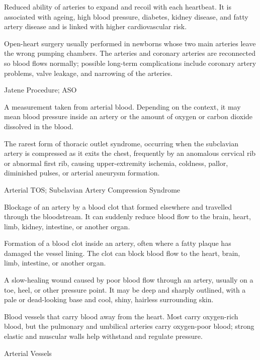  Reduced ability of arteries to expand and recoil with each heartbeat. It is associated with ageing, high blood pressure, diabetes, kidney disease, and fatty artery disease and is linked with higher cardiovascular risk.

 Open-heart surgery usually performed in newborns whose two main arteries leave the wrong pumping chambers. The arteries and coronary arteries are reconnected so blood flows normally; possible long-term complications include coronary artery problems, valve leakage, and narrowing of the arteries.

\synonyms
Jatene Procedure; ASO

 A measurement taken from arterial blood. Depending on the context, it may mean blood pressure inside an artery or the amount of oxygen or carbon dioxide dissolved in the blood.

 The rarest form of thoracic outlet syndrome, occurring when the subclavian artery is compressed as it exits the chest, frequently by an anomalous cervical rib or abnormal first rib, causing upper-extremity ischemia, coldness, pallor, diminished pulses, or arterial aneurysm formation.

\synonyms
Arterial TOS; Subclavian Artery Compression Syndrome

 Blockage of an artery by a blood clot that formed elsewhere and travelled through the bloodstream. It can suddenly reduce blood flow to the brain, heart, limb, kidney, intestine, or another organ.

 Formation of a blood clot inside an artery, often where a fatty plaque has damaged the vessel lining. The clot can block blood flow to the heart, brain, limb, intestine, or another organ.

 A slow-healing wound caused by poor blood flow through an artery, usually on a toe, heel, or other pressure point. It may be deep and sharply outlined, with a pale or dead-looking base and cool, shiny, hairless surrounding skin.

 Blood vessels that carry blood away from the heart. Most carry oxygen-rich blood, but the pulmonary and umbilical arteries carry oxygen-poor blood; strong elastic and muscular walls help withstand and regulate pressure.

\synonyms
Arterial Vessels

